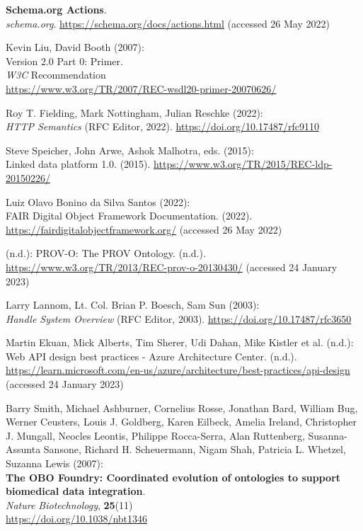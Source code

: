 \begin{thebibliography}{9}
\textbf{Schema.org {Actions}}.\\
\emph{schema.org}.
\url{https://schema.org/docs/actions.html} (accessed 26 May 2022)

Kevin Liu, David Booth (2007): \\
 {Version} 2.0
{Part} 0: {Primer}. \\
\emph{W3C} Recommendation \\
\url{https://www.w3.org/TR/2007/REC-wsdl20-primer-20070626/}

Roy T. Fielding, Mark Nottingham, Julian Reschke (2022): \\
\emph{{HTTP
Semantics}} ({RFC Editor}, 2022).
\url{https://doi.org/10.17487/rfc9110}

Steve Speicher, John Arwe, Ashok Malhotra, eds. (2015): \\
Linked data
platform 1.0. (2015). \url{https://www.w3.org/TR/2015/REC-ldp-20150226/}

Luiz Olavo Bonino da Silva Santos (2022): \\
{FAIR Digital Object Framework
Documentation}. (2022). \url{https://fairdigitalobjectframework.org/}
(accessed 26 May 2022)

(n.d.): {PROV-O}: {The PROV Ontology}. (n.d.).
\url{https://www.w3.org/TR/2013/REC-prov-o-20130430/} (accessed 24
January 2023)

Larry Lannom, Lt. Col. Brian P. Boesch, Sam Sun (2003): \\
\emph{Handle
{System Overview}} ({RFC Editor}, 2003).
\url{https://doi.org/10.17487/rfc3650}

Martin Ekuan, Mick Alberts, Tim Sherer, Udi Dahan, Mike Kistler et
al. (n.d.): Web {API} design best practices - {Azure Architecture
Center}. (n.d.).
\url{https://learn.microsoft.com/en-us/azure/architecture/best-practices/api-design}
(accessed 24 January 2023)

Barry Smith, Michael Ashburner, Cornelius Rosse, Jonathan Bard, William
Bug, Werner Ceusters, Louis J. Goldberg, Karen Eilbeck, Amelia Ireland,
Christopher J. Mungall, Neocles Leontis, Philippe Rocca-Serra, Alan
Ruttenberg, Susanna-Assunta Sansone, Richard H. Scheuermann, Nigam Shah,
Patricia L. Whetzel, Suzanna Lewis (2007): \\
\textbf{The {OBO Foundry}:
Coordinated evolution of ontologies to support biomedical data
integration}. \\
\emph{Nature Biotechnology}, \textbf{25}(11) \\
\url{https://doi.org/10.1038/nbt1346}


\end{thebibliography}
